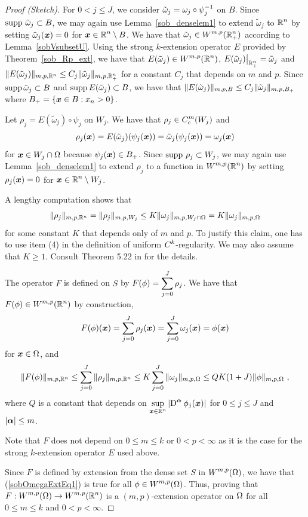 \begin{proof}[Proof (Sketch)]
For $0< j \leq J$, we consider
$\displaystyle \tilde{\omega}_j = \omega_j \circ \psi_j^{-1}$ on $B$.
Since $\operatorname{supp}\, \tilde{\omega}_j \subset B$, we may again use
Lemma~\ref{sob_denselem1} to extend $\tilde{\omega}_j$ to
$\displaystyle \mathbb{R}^n$ by setting
$\tilde{\omega}_j({\bm{x}}) = 0$ for
$\displaystyle {\bm{x}} \in \mathbb{R}^n \setminus B$.  We have that
$\displaystyle \tilde{\omega}_j \in W^{m,p}(\mathbb{R}^n_+)$
according to Lemma~\ref{sobVsubsetU}.
Using the strong $k$-extension operator $E$
provided by Theorem~\ref{sob_Rp_ext}, we have that
$\displaystyle E(\tilde{\omega}_j) \in W^{m,p}(\mathbb{R}^n)$,
$E(\tilde{\omega}_j)\big|_{\mathbb{R}^n_+} = \tilde{\omega}_j$ and
$\displaystyle \|E(\tilde{\omega}_j)\|_{m,p,\mathbb{R}^n} \leq
C_j \|\tilde{\omega}_j\|_{m,p,\mathbb{R}^n_+}$
for a constant $C_j$ that depends on $m$ and $p$.
Since $\operatorname{supp} \tilde{\omega}_j \subset B$ and
$\operatorname{supp} E(\tilde{\omega}_j) \subset B$, we have that
$\displaystyle \|E(\tilde{\omega}_j)\|_{m,p,B} \leq
C_j \|\tilde{\omega}_j\|_{m,p,B_+}$ where $B_+= \{{\bm{x}} \in B : x_n> 0\}$.

Let $\rho_j = E(\tilde{\omega}_j) \circ \psi_j$ on $W_j$.  We have
that $\displaystyle \rho_j \in C_c^m(W_j)$ and
\[
\rho_j({\bm{x}}) = E(\tilde{\omega}_j)(\psi_j({\bm{x}}))
= \tilde{\omega}_j(\psi_j({\bm{x}})) = \omega_j({\bm{x}})
\]
for ${\bm{x}} \in W_j \cap \Omega$ because $\psi_j({\bm{x}}) \in B_+$. 
Since $\operatorname{supp}\, \rho_j \subset W_j$, we may again use
Lemma~\ref{sob_denselem1} to extend $\rho_j$ to a
function in $\displaystyle W^{m,p}(\mathbb{R}^n)$ by setting
$\rho_j({\bm{x}}) = 0$ for $\displaystyle {\bm{x}} \in \mathbb{R}^n \setminus W_j$.

A lengthy computation shows that
\[
  \|\rho_j\|_{m,p,\mathbb{R}^n} = \|\rho_j\|_{m,p,W_j} 
\leq K \|\omega_j\|_{m,p,W_j\cap \Omega} = K \|\omega_j\|_{m,p,\Omega}
\]
for some constant $K$ that depends only of $m$ and $p$.  To justify
this claim, one has to use item (4) in the definition of uniform
$\displaystyle C^k$-regularity.  We may also assume that $K \geq 1$.  Consult
Theorem 5.22 in \cite{Ad} for the details.

The operator $F$ is defined on $S$ by
$\displaystyle F(\phi) = \sum_{j=0}^J \rho_j$.
We have that $\displaystyle F(\phi) \in W^{m,p}(\mathbb{R}^n)$ by construction,
\[
  F(\phi)({\bm{x}}) = \sum_{j=0}^J \rho_j({\bm{x}})
  = \sum_{j=0}^J \omega_j({\bm{x}}) = \phi({\bm{x}})
\]
for ${\bm{x}} \in \Omega$, and
\begin{equation}\label{sobOmegaExtEq1}
\|F(\phi)\|_{m,p,\mathbb{R}^n} \leq \sum_{j=0}^J \|\rho_j\|_{m,p,\mathbb{R}^n}
\leq K \sum_{j=0}^J \|\omega_j\|_{m,p,\Omega}
\leq QK(1+J)  \|\phi\|_{m,p,\Omega} \ ,
\end{equation}
where $Q$ is a constant that depends on
$\displaystyle \sup_{{\bm{x}} \in \mathbb{R}^n}
\left|\operatorname{D}^{{\bm{\alpha}}} \phi_j({\bm{x}}) \right|$
for $0 \leq j \leq J$ and $|{\bm{\alpha}}| \leq m$.

Note that $F$ does not depend on $0 \leq m \leq k$ or $0 < p < \infty$
as it is the case for the strong $k$-extension operator $E$ used
above.

Since $F$ is defined by extension from the dense set $S$ in
$\displaystyle W^{m,p}(\Omega)$, we have that
(\ref{sobOmegaExtEq1}) is true for all
$\displaystyle \phi \in W^{m,p}(\Omega)$.  Thus, proving that
$\displaystyle F: W^{m,p}(\Omega) \to W^{m,p}(\mathbb{R}^n)$ is a $(m,p)$-extension
operator on $\displaystyle \Omega$ for all
$0\leq m \leq k$ and $0<p<\infty$.
\end{proof}

